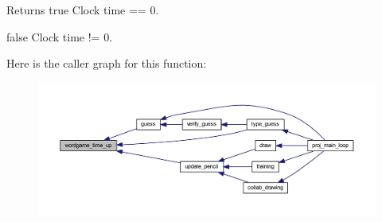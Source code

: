 \begin{DoxyReturn}{Returns}
true Clock time == 0. 

false Clock time != 0. 
\end{DoxyReturn}
Here is the caller graph for this function\+:\nopagebreak
\begin{figure}[H]
\begin{center}
\leavevmode
\includegraphics[width=350pt]{group__wordpicker_ga9ec7ee484cb29f6d473530e913fe02f9_icgraph}
\end{center}
\end{figure}
